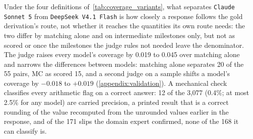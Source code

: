 Under the four definitions of~\autoref{tab:coverage_variants}, what separates
\texttt{Claude Sonnet 5} from \texttt{DeepSeek V4.1 Flash} is how closely a response follows the
gold derivation's route, not whether it reaches the quantities its own route needs: the two differ
by matching alone and on intermediate milestones only, but not as scored or once the milestones the
judge rules not needed leave the denominator.
The judge raises every model's coverage by 0.019 to 0.045 over matching alone and narrows the
differences between models: matching alone separates 20 of the 55 pairs, MC as scored 15, and a
second judge on a sample shifts a model's coverage by $-0.018$ to $+0.019$
(\autoref{appendix:validation}).
A mechanical check classifies every arithmetic flag on a correct answer: 12 of the 3,077 (0.4\%;
at most 2.5\% for any model) are carried precision, a printed result that is a correct rounding of
the value recomputed from the unrounded values earlier in the response, and of the 171 slips the
domain expert confirmed, none of the 168 it can classify is.

